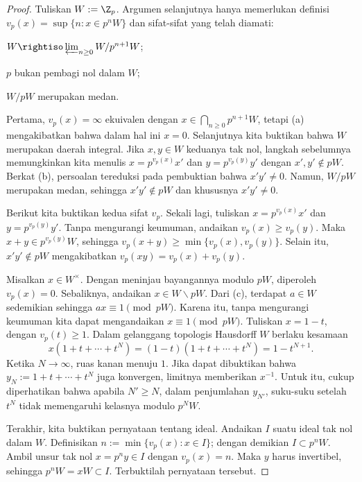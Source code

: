\begin{proof}
	Tuliskan $W := \Z_p$. Argumen selanjutnya hanya memerlukan definisi $v_p(x) = \sup\{n: x \in p^n W\}$ dan sifat-sifat yang telah diamati:
	\begin{inparaenum}[(a)]
		\item $W \rightiso \varprojlim_{n \geq 0} W/p^{n+1}W$;
		\item $p$ bukan pembagi nol dalam $W$;
		\item $W/pW$ merupakan medan.
	\end{inparaenum}

	Pertama, $v_p(x)=\infty$ ekuivalen dengan $x \in \bigcap_{n \geq 0} p^{n+1}W$, tetapi (a) mengakibatkan bahwa dalam hal ini $x=0$. Selanjutnya kita buktikan bahwa $W$ merupakan daerah integral. Jika $x,y \in W$ keduanya tak nol, langkah sebelumnya memungkinkan kita menulis $x=p^{v_p(x)} x'$ dan $y=p^{v_p(y)} y'$ dengan $x',y' \notin pW$. Berkat (b), persoalan tereduksi pada pembuktian bahwa $x'y' \neq 0$. Namun, $W/pW$ merupakan medan, sehingga $x'y' \notin pW$ dan khususnya $x'y' \neq 0$.

	Berikut kita buktikan kedua sifat $v_p$. Sekali lagi, tuliskan $x = p^{v_p(x)} x'$ dan $y = p^{v_p(y)} y'$. Tanpa mengurangi keumuman, andaikan $v_p(x) \geq v_p(y)$. Maka $x+y \in p^{v_p(y)}W$, sehingga $v_p(x+y) \geq \min\{ v_p(x), v_p(y)\}$. Selain itu, $x'y' \notin pW$ mengakibatkan $v_p(xy) = v_p(x) + v_p(y)$.

	Misalkan $x \in W^\times$. Dengan meninjau bayangannya modulo $pW$, diperoleh $v_p(x) = 0$. Sebaliknya, andaikan $x \in W \smallsetminus pW$. Dari (c), terdapat $a \in W$ sedemikian sehingga $ax \equiv 1 \pmod{pW}$. Karena itu, tanpa mengurangi keumuman kita dapat mengandaikan $x \equiv 1 \pmod{pW}$. Tuliskan $x = 1-t$, dengan $v_p(t) \geq 1$. Dalam gelanggang topologis Hausdorff $W$ berlaku kesamaan
	\[ x(1 + t + \cdots + t^N) = (1 - t)(1 + t + \cdots + t^N) = 1 - t^{N+1}. \]
	Ketika $N \to \infty$, ruas kanan menuju $1$. Jika dapat dibuktikan bahwa $y_N := 1+ t +\cdots + t^N$ juga konvergen, limitnya memberikan $x^{-1}$. Untuk itu, cukup diperhatikan bahwa apabila $N' \geq N$, dalam penjumlahan $y_{N'}$, suku-suku setelah $t^N$ tidak memengaruhi kelasnya modulo $p^N W$.

	Terakhir, kita buktikan pernyataan tentang ideal. Andaikan $I$ suatu ideal tak nol dalam $W$. Definisikan $n := \min\{v_p(x) : x \in I\}$; dengan demikian $I \subset p^n W$. Ambil unsur tak nol $x = p^n y \in I$ dengan $v_p(x)=n$. Maka $y$ harus invertibel, sehingga $p^n W = xW \subset I$. Terbuktilah pernyataan tersebut.
\end{proof}

